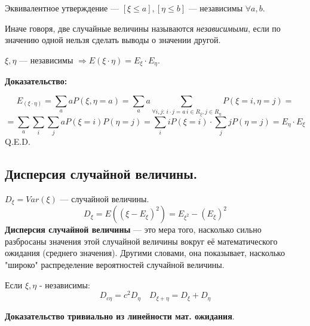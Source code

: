 Эквивалентное утверждение --- $[\xi\leq a], [\eta\leq b]$ --- независимы $\forall a,b$.

Иначе говоря, две случайные величины называются \emph{независимыми}, если по значению одной нельзя сделать выводы о значении другой.


$\xi,\eta$ --- независимы $\Rightarrow E(\xi\cdot\eta)=E_{\xi}\cdot E_{\eta}$.

\textbf{Доказательство:}

$$E_{(\xi\cdot \eta)}=\sum\limits_{a}a P(\xi,\eta = a) = 
\sum\limits_{a}a\sum\limits_{\forall i,j: \,i\cdot j= a \, i \in R_{\xi},j\in R_{\eta}}P(\xi = i, \eta = j) =$$ $$= \sum\limits_{a}\sum\limits_{i}\sum\limits_{j} aP(\xi=i) P(\eta = j) = \sum\limits_{i}iP(\xi=i)\cdot \sum\limits_{j}jP(\eta=j) = E_{\eta}\cdot E_{\xi}$$
\hfill Q.E.D.

\subsection{Дисперсия случайной величины.}
$D_{\xi} = Var(\xi)$ ---  случайной величины. 
$$D_{\xi}= E((\xi - E_{\xi})^2)= E_{\xi^2}-(E_{\xi})^2$$
\textbf{Дисперсия случайной величины} --- это мера того, насколько сильно разбросаны значения этой случайной величины вокруг её математического ожидания (среднего значения). Другими словами, она показывает, насколько "широко" распределение вероятностей случайной величины.

Если $\xi,\eta$ - независимы:
$$D_{c\eta} = c^2 D_{\eta}\quad D_{\xi+\eta}=D_{\xi}+D_{\eta}$$

\textbf{Доказательство тривиально из линейности мат. ожидания}.